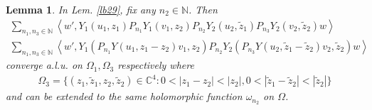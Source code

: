 \documentclass[11pt,b5paper,notitlepage]{article}
\theoremstyle{definition}
\theoremstyle{plain}
\newtheorem{lm}[df]{Lemma}
\newcommand{\wtd}{\widetilde}
\newcommand{\Cbb}{\mathbb C}
\newcommand{\Nbb}{\mathbb N}
\newcommand{\<}{\left\langle}
\renewcommand{\>}{\right\rangle}
\numberwithin{equation}{subsection}
\begin{document}
\begin{lm}\label{lb30}
In Lem. \ref{lb29}, fix any $n_2\in\Nbb$. Then
\begin{subequations}
\begin{gather}
\sum_{n_1,n_3\in\Nbb} \<w',Y_1(u_1,z_1)P_{n_1}Y_1(v_1,z_2)P_{n_2}Y_2(u_2, \wtd z_1)P_{n_3}Y_2(v_2,\wtd z_2)w\> \label{eq94}\\
\sum_{n_1,n_3\in\Nbb}\<w',Y_1(P_{n_1}Y(u_1,z_1-z_2)v_1,z_2)P_{n_2}Y_2(P_{n_3}Y(u_2,\wtd z_1-\wtd z_2)v_2,\wtd z_2)w\> \label{eq95}
\end{gather}
\end{subequations}
converge a.l.u. on $\Omega_1,\Omega_3$ respectively where
\begin{align}
\Omega_3=\{(z_1,\wtd z_1,z_2,\wtd z_2)\in\Cbb^4:0<|z_1-z_2|<|z_2|,0<|\wtd z_1-\wtd z_2|<|\wtd z_2|\}
\end{align}
and can be extended to the same holomorphic function $\omega_{n_2}$ on $\Omega$.
\end{lm}
\end{document}
